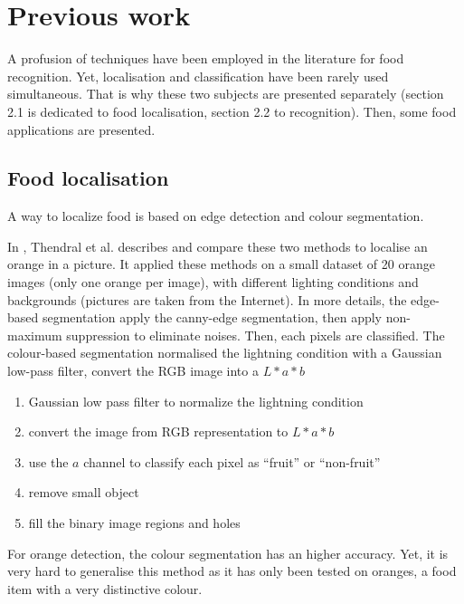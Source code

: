 \chapter{Previous work} \label{sec:previous_work}

A profusion of techniques have been employed in the literature for food recognition. Yet, localisation and classification have been rarely used simultaneous. That is why these two subjects are presented separately (section 2.1 is dedicated to food localisation, section 2.2 to recognition). Then, some food applications are presented.

\section{Food localisation}


A way to localize food is based on edge detection and colour segmentation.

In \cite{Thendral2014a}, Thendral et al. describes and compare these two methods to localise an orange in a picture. It applied these methods on a small dataset of 20 orange images (only one orange per image), with different lighting conditions and backgrounds (pictures are taken from the Internet).
In more details, the edge-based segmentation apply the canny-edge segmentation, then apply non-maximum suppression to eliminate noises. Then, each pixels are classified.
The colour-based segmentation normalised the lightning condition with a Gaussian low-pass filter, convert the RGB image into a $L * a * b$
\begin{enumerate}
    \item Gaussian low pass filter to normalize the lightning condition
    \item convert the image from RGB representation to $L * a * b$
    \item use the $a$ channel to classify each pixel as \enquote{fruit} or \enquote{non-fruit}
    \item remove small object
    \item fill the binary image regions and holes
\end{enumerate}
For orange detection, the colour segmentation has an higher accuracy. Yet, it is very hard to generalise this method as it has only been tested on oranges, a food item with a very distinctive colour.


